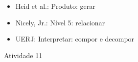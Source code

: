 \begin{multicols}{2}
  \vspace{.1cm}

 \vspace{.1cm}
\begin{itemize} %
    \item       Heid et al.: Produto: gerar
    \item       Nicely, Jr.: Nível 5: relacionar
    \item       UERJ: Interpretar: compor e decompor
\end{itemize} %

 \vspace*{\fill}
\columnbreak

\begin{resposta*}{Atividade 11}




\end{resposta*}
\end{multicols}
